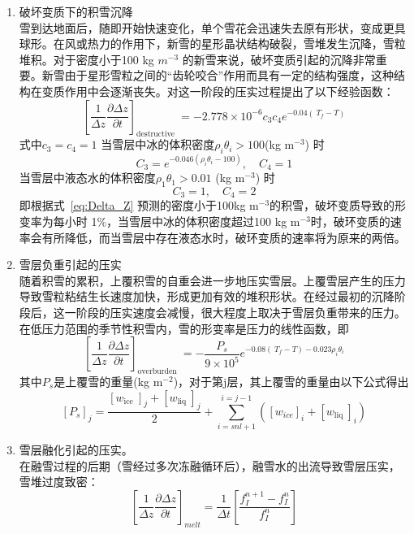 \begin{enumerate}
\item 破坏变质下的积雪沉降\\
雪到达地面后，随即开始快速变化，单个雪花会迅速失去原有形状，变成更具球形。在风或热力的作用下，新雪的星形晶状结构破裂，雪堆发生沉降，雪粒堆积。对于密度小于100 kg $m^{-3}$ 的新雪来说，破坏变质引起的沉降非常重要。新雪由于星形雪粒之间的“齿轮咬合”作用而具有一定的结构强度，这种结构在变质作用中会逐渐丧失。\citet{anderson1976point}对这一阶段的压实过程提出了以下经验函数：
\begin{equation}\label{eq:Delta_Z}
\left[\frac{1}{\Delta {z}} \frac{\partial \Delta {z}}{\partial {t}}\right]_{\text {destructive }}=-2.778 \times 10^{-6} {c}_{3} {c}_{4} {e}^{-0.04\left({~T}_{{f}}-{T}\right)}
\end{equation}
式中${c}_{3}={c}_{4}=1$
当雪层中冰的体积密度$\rho_{i} \theta_{i}>100$(kg m$^{-3}$) 时
\begin{equation}
{C}_{3}={e}^{-0.046\left(\rho_{{i}} \theta_{{i}}-100\right)}, \quad {C}_{4}=1
\end{equation}
当雪层中液态水的体积密度$\rho_{1} \theta_{1}>0.01$ (kg m$^{-3}$) 时
\begin{equation}
{C}_{3}=1,\quad  {C}_{4}=2
\end{equation}
即根据式~\ref{eq:Delta_Z} 预测的密度小于100kg m$^{-3}$的积雪，破坏变质导致的形变率为每小时 1\%，当雪层中冰的体积密度超过100 kg m$^{-3}$时，破环变质的速率会有所降低，而当雪层中存在液态水时，破环变质的速率将为原来的两倍。

\item 雪层负重引起的压实\\
随着积雪的累积，上覆积雪的自重会进一步地压实雪层。上覆雪层产生的压力导致雪粒粘结生长速度加快，形成更加有效的堆积形状。在经过最初的沉降阶段后，这一阶段的压实速度会减慢，很大程度上取决于雪层负重带来的压力。在低压力范围的季节性积雪内，雪的形变率是压力的线性函数，即
\begin{equation}
\left[\frac{1}{\Delta {z}} \frac{\partial \Delta {z}}{\partial {t}}\right]_{\text {overburden }}=-\frac{{P}_{{s}}}{9 \times 10^{5}} {e}^{-0.08\left({~T}_{{f}}-{T}\right)-0.023 \rho_{{i}} \theta_{{i}}}
\end{equation}
其中$P_{s}$是上覆雪的重量(kg m$^{-2}$)，对于第j层，其上覆雪的重量由以下公式得出
\begin{equation}
\left[P_{s}\right]_{j}=\frac{\left[w_{\text {ice }}\right]_{j}+\left[w_{\text {liq }}\right]_{j}}{2}+\sum_{{i}={snl}+1}^{{i}={j}-1}\left(\left[{w}_{{ice}}\right]_{{i}}+\left[{w}_{\text {liq }}\right]_{{i}}\right)
\end{equation}

\item 雪层融化引起的压实。\\
在融雪过程的后期（雪经过多次冻融循环后），融雪水的出流导致雪层压实，雪堆过度致密：
\begin{equation}
\left[\frac{1}{\Delta {z}} \frac{\partial \Delta {z}}{\partial {t}}\right]_{{melt}}=\frac{1}{\Delta {t}}\left[\frac{{f}_{{I}}^{{n}+1}-{f}_{{I}}^{{n}}}{{f}_{{I}}^{{n}}}\right]
\end{equation}
\end{enumerate}
